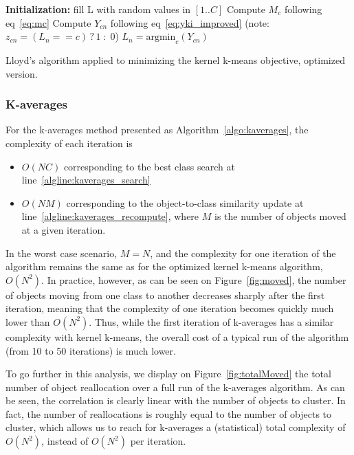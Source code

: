 \documentclass[natbib,smallextended]{svjour3}
\begin{document}
\begin{algorithm}
	\label{algo:kkmeans_optim}
	\SetAlgoLined
	\BlankLine
	\textbf{Initialization:}
	fill L with random values in $[1..C]$\;
	\BlankLine
	 {
	     {
	        Compute $M_c$ following eq~\ref{eq:mc} \label{algline:kkmeans_imp_mc}
	    }
		 {
			 {
				Compute $Y_{cn}$ following eq~\ref{eq:yki_improved} \label{algline:kkmeans_imp_cplx1}
				(note: $z_{cn} = (L_n == c)\,?\,1\;:\;0$)
			}
			$L_n = \textrm{argmin}_c (Y_{cn})$\;
		}
	}
	\BlankLine
	\caption{Lloyd's algorithm applied to minimizing the kernel k-means objective, optimized version.}
\end{algorithm}


\subsubsection{K-averages}

For the k-averages method presented as Algorithm~\ref{algo:kaverages}, the complexity of each iteration is
\begin{itemize}
\item $O(NC)$ corresponding to the best class search at line~\ref{algline:kaverages_search}
\item  $O(NM)$ corresponding to the object-to-class similarity update at line~\ref{algline:kaverages_recompute}, where $M$ is the number of objects moved at a given iteration.
\end{itemize}

In the worst case scenario, $M = N$, and the complexity for one iteration of the algorithm remains the same as for the optimized kernel k-means algorithm, $O(N^2)$. In practice, however, as can be seen on Figure~\ref{fig:moved}, the number of objects moving from one class to another decreases sharply after the first iteration, meaning that the complexity of one iteration becomes quickly much lower than $O(N^2)$. Thus, while the first iteration of k-averages has a similar complexity with kernel k-means, the overall cost of a typical run of the algorithm (from 10 to 50 iterations) is much lower.


To go further in this analysis, we display on Figure~\ref{fig:totalMoved}  the total number of object reallocation over a full run of the k-averages algorithm. As can be seen, the correlation is clearly linear with the number of objects to cluster. In fact, the number of reallocations is roughly equal to the number of objects to cluster, which allows us to reach for k-averages a (statistical) total complexity of $O(N^2)$, instead of $O(N^2)$ per iteration.
\end{document}
